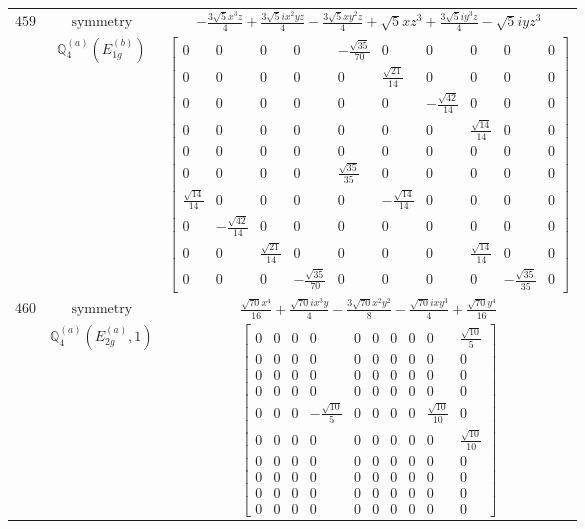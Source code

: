 \documentclass[fleqn,8pt,landscape]{jsarticle}
\begin{document}
\begin{longtable}{ccc}
$ 459 $ & $ \text{symmetry} $ & $ - \frac{3 \sqrt{5} x^{3} z}{4} + \frac{3 \sqrt{5} i x^{2} y z}{4} - \frac{3 \sqrt{5} x y^{2} z}{4} + \sqrt{5} x z^{3} + \frac{3 \sqrt{5} i y^{3} z}{4} - \sqrt{5} i y z^{3} $ \\
$  $ & $ \mathbb{Q}_{4}^{(a)}(E_{1g}^{(b)}) $ & $ \begin{bmatrix} 0 & 0 & 0 & 0 & - \frac{\sqrt{35}}{70} & 0 & 0 & 0 & 0 & 0 \\ 0 & 0 & 0 & 0 & 0 & \frac{\sqrt{21}}{14} & 0 & 0 & 0 & 0 \\ 0 & 0 & 0 & 0 & 0 & 0 & - \frac{\sqrt{42}}{14} & 0 & 0 & 0 \\ 0 & 0 & 0 & 0 & 0 & 0 & 0 & \frac{\sqrt{14}}{14} & 0 & 0 \\ 0 & 0 & 0 & 0 & 0 & 0 & 0 & 0 & 0 & 0 \\ 0 & 0 & 0 & 0 & \frac{\sqrt{35}}{35} & 0 & 0 & 0 & 0 & 0 \\ \frac{\sqrt{14}}{14} & 0 & 0 & 0 & 0 & - \frac{\sqrt{14}}{14} & 0 & 0 & 0 & 0 \\ 0 & - \frac{\sqrt{42}}{14} & 0 & 0 & 0 & 0 & 0 & 0 & 0 & 0 \\ 0 & 0 & \frac{\sqrt{21}}{14} & 0 & 0 & 0 & 0 & \frac{\sqrt{14}}{14} & 0 & 0 \\ 0 & 0 & 0 & - \frac{\sqrt{35}}{70} & 0 & 0 & 0 & 0 & - \frac{\sqrt{35}}{35} & 0 \end{bmatrix} $ \\ \hline
$ 460 $ & $ \text{symmetry} $ & $ \frac{\sqrt{70} x^{4}}{16} + \frac{\sqrt{70} i x^{3} y}{4} - \frac{3 \sqrt{70} x^{2} y^{2}}{8} - \frac{\sqrt{70} i x y^{3}}{4} + \frac{\sqrt{70} y^{4}}{16} $ \\
$  $ & $ \mathbb{Q}_{4}^{(a)}(E_{2g}^{(a)},1) $ & $ \begin{bmatrix} 0 & 0 & 0 & 0 & 0 & 0 & 0 & 0 & 0 & \frac{\sqrt{10}}{5} \\ 0 & 0 & 0 & 0 & 0 & 0 & 0 & 0 & 0 & 0 \\ 0 & 0 & 0 & 0 & 0 & 0 & 0 & 0 & 0 & 0 \\ 0 & 0 & 0 & 0 & 0 & 0 & 0 & 0 & 0 & 0 \\ 0 & 0 & 0 & - \frac{\sqrt{10}}{5} & 0 & 0 & 0 & 0 & \frac{\sqrt{10}}{10} & 0 \\ 0 & 0 & 0 & 0 & 0 & 0 & 0 & 0 & 0 & \frac{\sqrt{10}}{10} \\ 0 & 0 & 0 & 0 & 0 & 0 & 0 & 0 & 0 & 0 \\ 0 & 0 & 0 & 0 & 0 & 0 & 0 & 0 & 0 & 0 \\ 0 & 0 & 0 & 0 & 0 & 0 & 0 & 0 & 0 & 0 \\ 0 & 0 & 0 & 0 & 0 & 0 & 0 & 0 & 0 & 0 \end{bmatrix} $ \\ \hline

\end{longtable}
\end{document}
